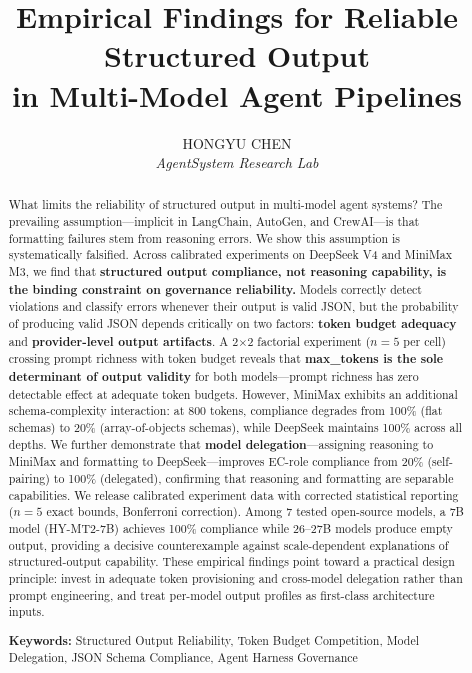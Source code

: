 \documentclass[11pt,a4paper]{article}
\title{\textbf{Empirical Findings for Reliable Structured Output\\in Multi-Model Agent Pipelines}}
\author{HONGYU CHEN\\\textit{AgentSystem Research Lab}}
\date{}
\begin{document}
\sloppy\raggedbottom\maketitle

\begin{abstract}
What limits the reliability of structured output in multi-model agent systems? The prevailing assumption---implicit in LangChain, AutoGen, and CrewAI---is that formatting failures stem from reasoning errors. We show this assumption is systematically falsified. Across calibrated experiments on DeepSeek V4 and MiniMax M3, we find that \textbf{structured output compliance, not reasoning capability, is the binding constraint on governance reliability.} Models correctly detect violations and classify errors whenever their output is valid JSON, but the probability of producing valid JSON depends critically on two factors: \textbf{token budget adequacy} and \textbf{provider-level output artifacts}. A 2$\times$2 factorial experiment ($n=5$ per cell) crossing prompt richness with token budget reveals that \textbf{max\_tokens is the sole determinant of output validity} for both models---prompt richness has zero detectable effect at adequate token budgets. However, MiniMax exhibits an additional schema-complexity interaction: at 800 tokens, compliance degrades from 100\% (flat schemas) to 20\% (array-of-objects schemas), while DeepSeek maintains 100\% across all depths. We further demonstrate that \textbf{model delegation}---assigning reasoning to MiniMax and formatting to DeepSeek---improves EC-role compliance from 20\% (self-pairing) to 100\% (delegated), confirming that reasoning and formatting are separable capabilities. We release calibrated experiment data with corrected statistical reporting ($n=5$ exact bounds, Bonferroni correction). Among 7 tested open-source models, a 7B model (HY-MT2-7B) achieves 100\% compliance while 26--27B models produce empty output, providing a decisive counterexample against scale-dependent explanations of structured-output capability. These empirical findings point toward a practical design principle: invest in adequate token provisioning and cross-model delegation rather than prompt engineering, and treat per-model output profiles as first-class architecture inputs.

\textbf{Keywords:} Structured Output Reliability, Token Budget Competition, Model Delegation, JSON Schema Compliance, Agent Harness Governance
\end{abstract}

\end{document}
